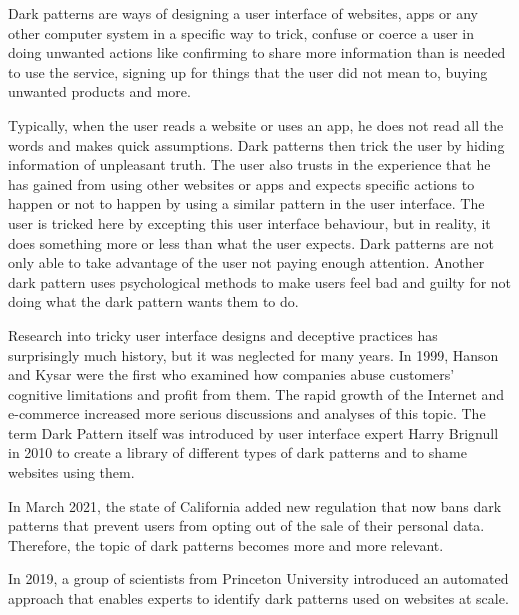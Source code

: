 \label{Introduction}
Dark patterns\cite{dark-patterns-brignull, dark-patterns-colin, the-year-dark-pattern-won, dark-patterns-at-scale} are ways of designing a user interface of websites, apps or any other computer system in a specific way to trick, confuse or coerce a user in doing unwanted actions like confirming to share more information than is needed to use the service, signing up for things that the user did not mean to, buying unwanted products and more. 

Typically, when the user reads a website or uses an app, he does not read all the words and makes quick assumptions\cite{dark-patterns-brignull}. Dark patterns then trick the user by hiding information of unpleasant truth. The user also trusts in the experience that he has gained from using other websites or apps and expects specific actions to happen or not to happen by using a similar pattern in the user interface. The user is tricked here by excepting this user interface behaviour, but in reality, it does something more or less than what the user expects\cite{the-year-dark-pattern-won}. Dark patterns are not only able to take advantage of the user not paying enough attention. Another dark pattern uses psychological methods to make users feel bad and guilty for not doing what the dark pattern wants them to do\cite{the-year-dark-pattern-won}.

Research into tricky user interface designs and deceptive practices has surprisingly much history, but it was neglected for many years. In 1999, Hanson and Kysar were the first who examined how companies abuse customers' cognitive limitations and profit from them. The rapid growth of the Internet and e-commerce increased more serious discussions and analyses of this topic. The term Dark Pattern itself was introduced by user interface expert Harry Brignull in 2010 to create a library of different types of dark patterns and to shame websites using them\cite{dark-patterns-brignull-about-us}. 

In March 2021, the state of California added new regulation that now bans dark patterns that prevent users from opting out of the sale of their personal data\cite{california-bans-dark-patterns}. Therefore, the topic of dark patterns becomes more and more relevant.

In 2019, a group of scientists from Princeton University introduced an automated approach that enables experts to identify dark patterns used on websites at scale\cite{dark-patterns-at-scale}. 

